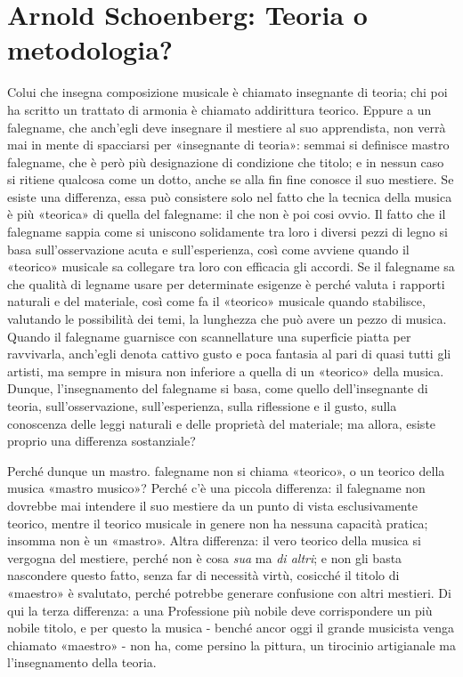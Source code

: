 \section{Arnold Schoenberg: Teoria o metodologia?}

Colui che insegna composizione musicale è chiamato insegnante di teoria; chi poi ha scritto un trattato di armonia è chiamato addirittura teorico. Eppure a un falegname, che anch'egli deve insegnare il mestiere al suo apprendista, non verrà mai in mente di spacciarsi per «insegnante di teoria»: semmai si definisce mastro falegname, che è però più designazione di condizione che titolo; e in nessun caso si ritiene qualcosa come un dotto, anche se alla fin fine conosce il suo mestiere. Se esiste una differenza, essa può consistere solo nel fatto che la tecnica della musica è più «teorica» di quella del falegname: il che non è poi cosi ovvio. Il fatto che il falegname sappia come si uniscono solidamente tra loro i diversi pezzi di legno si basa sull'osservazione acuta e sull'esperienza, così come avviene quando il «teorico» musicale sa collegare tra loro con efficacia gli accordi. Se il falegname sa che qualità di legname usare per determinate esigenze è perché valuta i rapporti naturali e del materiale, così come fa il «teorico» musicale quando stabilisce, valutando le possibilità dei temi, la lunghezza che può avere un pezzo di musica. Quando il falegname guarnisce con scannellature una superficie piatta per ravvivarla, anch'egli denota cattivo gusto e poca fantasia al pari di quasi tutti gli artisti, ma sempre in misura non inferiore a quella di un «teorico» della musica. Dunque, l'insegnamento del falegname si basa, come quello dell'insegnante di teoria, sull'osservazione, sull'esperienza, sulla riflessione e il gusto, sulla conoscenza delle leggi naturali e delle proprietà del materiale; ma allora, esiste proprio una differenza sostanziale?

Perché dunque un mastro. falegname non si chiama «teorico», o un teorico della musica «mastro musico»? Perché c'è una piccola differenza: il falegname non dovrebbe mai intendere il suo mestiere da un punto di vista esclusivamente teorico, mentre il teorico musicale in genere non ha nessuna capacità pratica; insomma non è un «mastro». Altra differenza: il vero teorico della musica si vergogna del mestiere, perché non è cosa \emph{sua} ma \emph{di altri}; e non gli basta nascondere questo fatto, senza far di necessità virtù, cosicché il titolo di «maestro» è svalutato, perché potrebbe generare confusione con altri mestieri. Di qui la terza differenza: a una Professione più nobile deve corrispondere un più nobile titolo, e per questo la musica - benché ancor oggi il grande musicista venga chiamato «maestro» - non ha, come persino la pittura, un tirocinio artigianale ma l'insegnamento della teoria.

